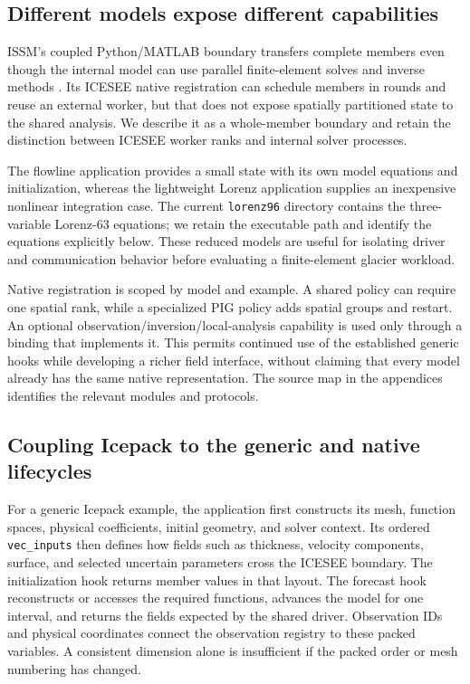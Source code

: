 \documentclass[11pt,a4paper]{article}
\newcommand{\code}[1]{\nolinkurl{#1}}
\begin{document}
\subsection{Different models expose different capabilities}
ISSM's coupled Python/MATLAB boundary transfers complete members even though the internal model can use parallel finite-element solves and inverse methods \citep{larour2012}. Its ICESEE native registration can schedule members in rounds and reuse an external worker, but that does not expose spatially partitioned state to the shared analysis. We describe it as a whole-member boundary and retain the distinction between ICESEE worker ranks and internal solver processes.

The flowline application provides a small state with its own model equations and initialization, whereas the lightweight Lorenz application supplies an inexpensive nonlinear integration case. The current \code{lorenz96} directory contains the three-variable Lorenz-63 equations; we retain the executable path and identify the equations explicitly below. These reduced models are useful for isolating driver and communication behavior before evaluating a finite-element glacier workload.

Native registration is scoped by model and example. A shared policy can require one spatial rank, while a specialized PIG policy adds spatial groups and restart. An optional observation/inversion/local-analysis capability is used only through a binding that implements it. This permits continued use of the established generic hooks while developing a richer field interface, without claiming that every model already has the same native representation. The source map in the appendices identifies the relevant modules and protocols.

\subsection{Coupling Icepack to the generic and native lifecycles}
For a generic Icepack example, the application first constructs its mesh, function spaces, physical coefficients, initial geometry, and solver context. Its ordered \code{vec_inputs} then defines how fields such as thickness, velocity components, surface, and selected uncertain parameters cross the ICESEE boundary. The initialization hook returns member values in that layout. The forecast hook reconstructs or accesses the required functions, advances the model for one interval, and returns the fields expected by the shared driver. Observation IDs and physical coordinates connect the observation registry to these packed variables. A consistent dimension alone is insufficient if the packed order or mesh numbering has changed.
\end{document}
